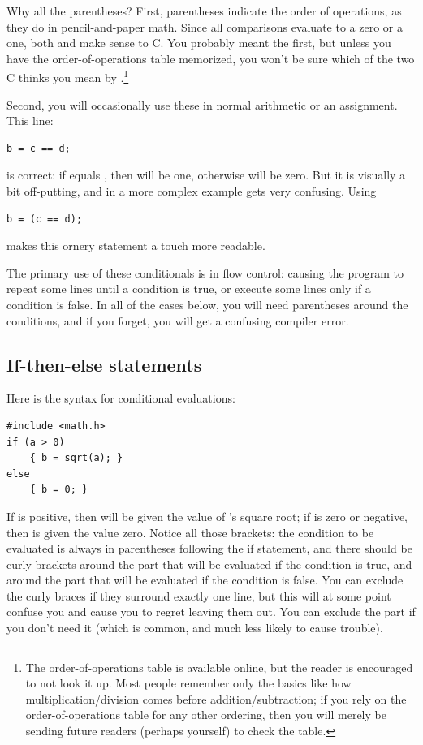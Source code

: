 \documentclass[12pt]{article}
\makeatletter
\def\cindex#1{\index{#1@\cinline{#1}}}
\makeatother
\begin{document}
Why all the parentheses? First, parentheses indicate the order of
operations, as they do in pencil-and-paper math. Since all comparisons
evaluate to a zero or a one, both 
and  make sense to C. You probably meant
the first, but unless you have the order-of-operations table memorized,
you won't be sure which of the two C thinks you mean by .\footnote{The order-of-operations table is available
online, but the reader is encouraged to not look it up. Most
people remember only the basics like how multiplication/division comes before
addition/subtraction; if you rely on the order-of-operations table
for any other ordering, then you will merely be sending future readers
(perhaps yourself) to check the table.}

Second, you will occasionally use these in normal arithmetic or an assignment. This line:
\begin{lstlisting}
b = c == d;
\end{lstlisting}
is correct: if  equals , then  will be one, otherwise  will be zero. But
it is visually a bit off-putting, and in a more complex example gets very confusing. Using
\begin{lstlisting}
b = (c == d);
\end{lstlisting}
makes this ornery statement a touch more readable.

The primary use of these conditionals is in flow control: causing
the program to repeat some lines until a condition is true, or execute some lines only if a condition is
false.  In all of the cases below, you will need parentheses around the conditions, and if you forget,
you will get a confusing compiler error.

\subsection{If-then-else statements} Here is the syntax for conditional evaluations: \cindex{if}

\begin{lstlisting}
#include <math.h>
if (a > 0)
    { b = sqrt(a); }
else 
    { b = 0; }
\end{lstlisting}
If  is positive, then  will be given the value of 's square root; if  is
zero or negative, then  is given the value zero. Notice all those brackets: the condition to be
evaluated is always in parentheses following the if statement, and there should be curly brackets around
the part that will be evaluated if the condition is true, and around the part that will be evaluated if
the condition is false. You can exclude the curly braces if they surround exactly one line, but this
will at some point confuse you and cause you to regret leaving them out.
You can exclude the  part if you don't need it (which is
common, and much less likely to cause trouble).
\end{document}
